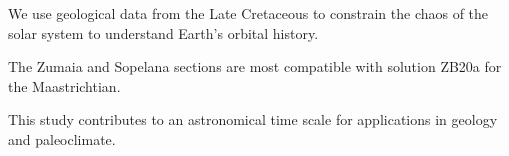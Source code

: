 \documentclass[draft]{agujournal2019}
\begin{document}

\begin{keypoints}
\item We use geological data from the Late Cretaceous to constrain the chaos of the solar system to understand Earth's orbital history.
\item The Zumaia and Sopelana sections are most compatible with solution ZB20a for the Maastrichtian.
\item This study contributes to an astronomical time scale for applications in geology and paleoclimate.
\end{keypoints}

%
%

%
%

\end{document}
